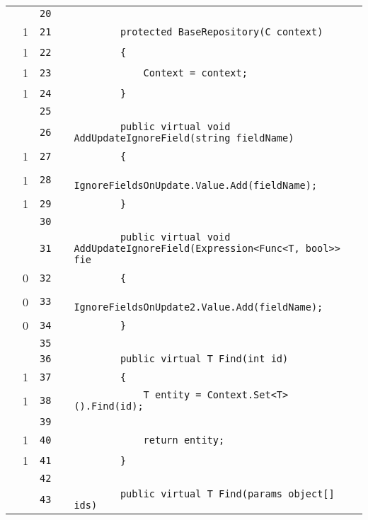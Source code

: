 \documentclass[a4paper,10pt]{article}
\begin{document}
\begin{longtable}[l]{lrrll}
\cellcolor{gray} &  & \verb~20~ & & \verb~~\\
\cellcolor{green} & 1 & \verb~21~ & & \verb~        protected BaseRepository(C context)~\\
\cellcolor{green} & 1 & \verb~22~ & & \verb~        {~\\
\cellcolor{green} & 1 & \verb~23~ & & \verb~            Context = context;~\\
\cellcolor{green} & 1 & \verb~24~ & & \verb~        }~\\
\cellcolor{gray} &  & \verb~25~ & & \verb~~\\
\cellcolor{gray} &  & \verb~26~ & & \verb~        public virtual void AddUpdateIgnoreField(string fieldName)~\\
\cellcolor{green} & 1 & \verb~27~ & & \verb~        {~\\
\cellcolor{green} & 1 & \verb~28~ & & \verb~            IgnoreFieldsOnUpdate.Value.Add(fieldName);~\\
\cellcolor{green} & 1 & \verb~29~ & & \verb~        }~\\
\cellcolor{gray} &  & \verb~30~ & & \verb~~\\
\cellcolor{gray} &  & \verb~31~ & & \verb~        public virtual void AddUpdateIgnoreField(Expression<Func<T, bool>> fie~\\
\cellcolor{red} & 0 & \verb~32~ & & \verb~        {~\\
\cellcolor{red} & 0 & \verb~33~ & & \verb~            IgnoreFieldsOnUpdate2.Value.Add(fieldName);~\\
\cellcolor{red} & 0 & \verb~34~ & & \verb~        }~\\
\cellcolor{gray} &  & \verb~35~ & & \verb~~\\
\cellcolor{gray} &  & \verb~36~ & & \verb~        public virtual T Find(int id)~\\
\cellcolor{green} & 1 & \verb~37~ & & \verb~        {~\\
\cellcolor{green} & 1 & \verb~38~ & & \verb~            T entity = Context.Set<T>().Find(id);~\\
\cellcolor{gray} &  & \verb~39~ & & \verb~~\\
\cellcolor{green} & 1 & \verb~40~ & & \verb~            return entity;~\\
\cellcolor{green} & 1 & \verb~41~ & & \verb~        }~\\
\cellcolor{gray} &  & \verb~42~ & & \verb~~\\
\cellcolor{gray} &  & \verb~43~ & & \verb~        public virtual T Find(params object[] ids)~\\

\end{longtable}
\end{document}
